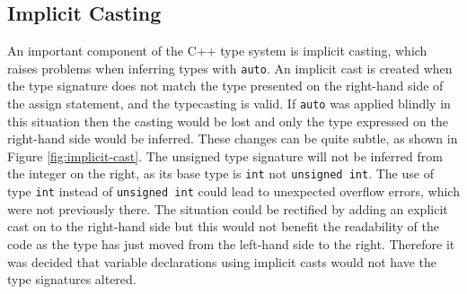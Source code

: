 \documentclass[bsc,frontabs,singlespacing,parskip,deptreport]{infthesis}
\begin{document}


\subsection{Implicit Casting} \label{sect:con-impl-cast}
An important component of the C++ type system is implicit casting, which raises problems when inferring types with \texttt{auto}. An implicit cast is created when the type signature does not match the type presented on the right-hand side of the assign statement, and the typecasting is valid. If \texttt{auto} was applied blindly in this situation then the casting would be lost and only the type expressed on the right-hand side would be inferred. These changes can be quite subtle, as shown in Figure \ref{fig:implicit-cast}. The unsigned type signature will not be inferred from the integer on the right, as its base type is \texttt{int} not \texttt{unsigned int}. The use of type \texttt{int} instead of \texttt{unsigned int} could lead to unexpected overflow errors, which were not previously there. The situation could be rectified by adding an explicit cast on to the right-hand side but this would not benefit the readability of the code as the type has just moved from the left-hand side to the right. Therefore it was decided that variable declarations using implicit casts would not have the type signatures altered.   
\end{document}
